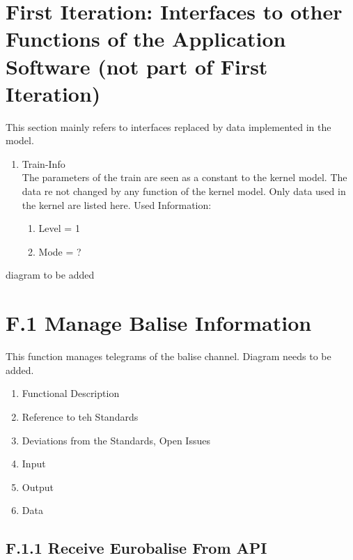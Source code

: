 \documentclass{template/openetcs_report}
\begin{document}
\section{First Iteration: Interfaces to other Functions of the Application Software (not part of First Iteration)}
This section mainly refers to interfaces replaced by data implemented in the model.

\begin{enumerate}
\item Train-Info\\
The parameters of the train are seen as a constant to the kernel model. The data re not changed by any function of the kernel model. Only data used in the kernel are listed here.
Used Information:
\begin{enumerate}
\item Level = 1\\
\item Mode = ?\\
\end{enumerate}
\end{enumerate}

diagram to be added

\section{F.1 Manage Balise Information}
This function manages telegrams of the balise channel. 
Diagram needs to be added.

\begin{enumerate}
\item Functional Description
\item Reference to teh Standards
\item Deviations from the Standards, Open Issues
\item Input
\item Output
\item Data
\end{enumerate}

\subsection{F.1.1 Receive Eurobalise From API}
\end{document}
